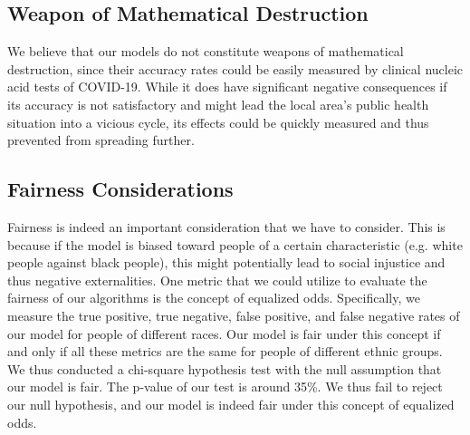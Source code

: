 \documentclass[a4paper, 11pt]{article}
\begin{document}
\subsection*{Weapon of Mathematical Destruction}
We believe that our models do not constitute weapons of mathematical destruction, since their accuracy rates could be easily measured by clinical nucleic acid tests of COVID-19. While it does have significant negative consequences if its accuracy is not satisfactory and might lead the local area's public health situation into a vicious cycle, its effects could be quickly measured and thus prevented from spreading further.

\subsection*{Fairness Considerations}
Fairness is indeed an important consideration that we have to consider. This is because if the model is biased toward people of a certain characteristic (e.g. white people against black people), this might potentially lead to social injustice and thus negative externalities. One metric that we could utilize to evaluate the fairness of our algorithms is the concept of equalized odds. Specifically, we measure the true positive, true negative, false positive, and false negative rates of our model for people of different races. Our model is fair under this concept if and only if all these metrics are the same for people of different ethnic groups. We thus conducted a chi-square hypothesis test with the null assumption that our model is fair. The p-value of our test is around 35\%. We thus fail to reject our null hypothesis, and our model is indeed fair under this concept of equalized odds.
\end{document}
